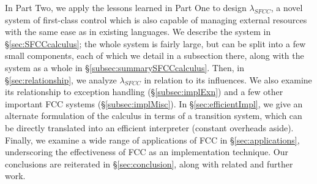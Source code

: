 \documentclass[11pt]{article}
\begin{document}
In Part Two, we apply the lessons learned in Part One to design $\lambda_{SFCC}$, a novel system of first-class control which is also capable of managing external resources with the same ease as in existing languages.
We describe the system in \S\ref{sec:SFCCcalculus};
the whole system is fairly large, but can be split into a few small components, each of which we detail in a subsection there, along with the system as a whole in \S\ref{subsec:summarySFCCcalculus}.
Then, in \S\ref{sec:relationship}, we analyze $\lambda_{SFCC}$ in relation to its influences.
We also examine its relationship to exception handling (\S\ref{subsec:implExn}) and a few other important FCC systems (\S\ref{subsec:implMisc}).
In \S\ref{sec:efficientImpl}, we give an alternate formulation of the calculus in terms of a transition system, which can be directly translated into an efficient interpreter (constant overheads aside).
Finally, we examine a wide range of applications of FCC in \S\ref{sec:applications}, underscoring the effectiveness of FCC as an implementation technique.
Our conclusions are reiterated in \S\ref{sec:conclusion}, along with related and further work.
\end{document}
